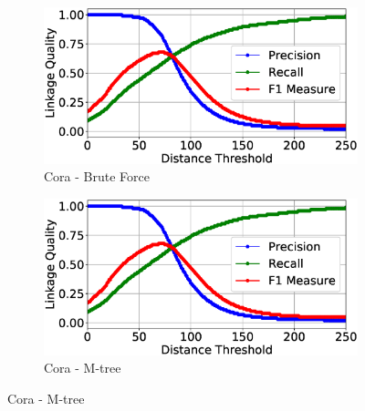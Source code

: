 \documentclass{llncs}
\begin{document}
\begin{figure}
\centering
\begin{subfigure}{.5\textwidth}
  \centering
\includegraphics[width=\textwidth]{figures/plotLQ-cora-brute}
\caption{Cora - Brute Force}
\end{subfigure}%
\begin{subfigure}{.5\textwidth}
  \centering
\includegraphics[width=\textwidth]{figures/plotLQ-cora-mtree}
\caption{Cora - M-tree}
\end{subfigure}


\end{figure}
\end{document}
